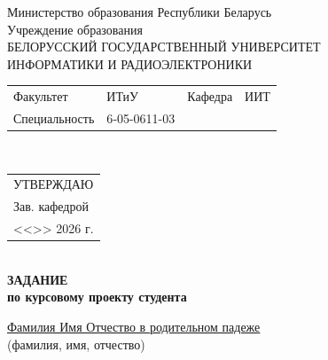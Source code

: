 {
  \thispagestyle{empty}
  \setlength{\parindent}{0em}

  \newcommand{\lineunderscore}{\uline{\hspace*{\fill}}}

  \begin{center}
    Министерство образования Республики Беларусь\\
    Учреждение образования\\
    БЕЛОРУССКИЙ ГОСУДАРСТВЕННЫЙ УНИВЕРСИТЕТ \\
    ИНФОРМАТИКИ И РАДИОЭЛЕКТРОНИКИ\\[1em]
  

  \begin{minipage}{\textwidth}
    \begin{flushleft}
      \begin{tabular}{ p{}p{}p{}p{} @{} }
        Факультет & ИТиУ & Кафедра & ИИТ \\
        Специальность   & 6‑05-0611-03
      \end{tabular}
    \end{flushleft}
  \end{minipage}\\[1em]

  \begin{minipage}{\textwidth}
    \begin{flushright}
      \begin{tabular}{p{}}
        УТВЕРЖДАЮ \\[0.5em]
        \underline{\hspace*{6em}} Зав. кафедрой \\
        
        <<\underline{\hspace*{4ex}}>> \underline{\hspace*{7em}} 2026 г.
      \end{tabular}
    \end{flushright}
  \end{minipage}\\[1em]

  \textbf{ЗАДАНИЕ} \\
  \textbf{по курсовому проекту студента}

  \lineunderscore\uline{Фамилия Имя Отчество в родительном падеже}\lineunderscore \\
  {\small (фамилия, имя, отчество) }


\end{center}}
